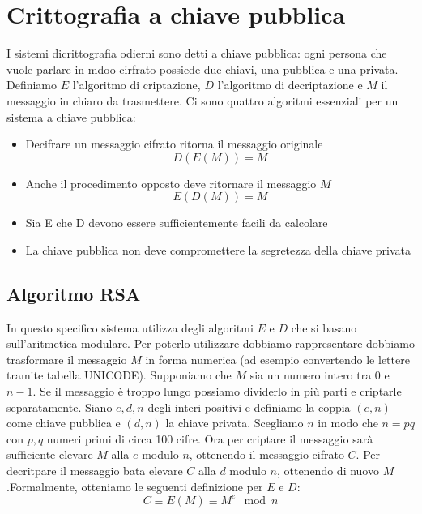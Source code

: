 \documentclass[italian,A4,12pt]{article}
\begin{document}
  \section{Crittografia a chiave pubblica}
    I sistemi dicrittografia odierni sono detti a chiave pubblica: ogni persona che vuole parlare in mdoo cirfrato possiede due chiavi, una pubblica e una privata.\\
    Definiamo $E$ l'algoritmo di criptazione, $D$ l'algoritmo di decriptazione e $M$ il messaggio in chiaro da trasmettere. Ci sono quattro algoritmi essenziali per un sistema a chiave pubblica:
    \begin{itemize}
      \item Decifrare un messaggio cifrato ritorna il messaggio originale $$D(E(M))=M$$
      \item Anche il procedimento opposto deve ritornare il messaggio $M$ $$E(D(M))=M$$
      \item Sia E che D devono essere sufficientemente facili da calcolare
      \item La chiave pubblica non deve compromettere la segretezza della chiave privata
    \end{itemize}
    \subsection{Algoritmo RSA}
      In questo specifico sistema utilizza degli algoritmi $E$ e $D$ che si basano sull'aritmetica modulare. Per poterlo utilizzare dobbiamo rappresentare dobbiamo trasformare il messaggio $M$ in forma numerica (ad esempio convertendo le lettere tramite tabella UNICODE). Supponiamo che $M$ sia un numero intero tra $0$ e $n-1$. Se il messaggio è troppo lungo possiamo dividerlo in più parti e criptarle separatamente. Siano $e,d,n$ degli interi positivi e definiamo la coppia $(e,n)$ come chiave pubblica e $(d,n)$ la chiave privata. Scegliamo $n$ in modo che $n=pq$ con $p,q$ numeri primi di circa 100 cifre.
      Ora per criptare il messaggio sarà sufficiente elevare $M$ alla $e$ modulo $n$, ottenendo il messaggio cifrato $C$. Per decritpare il messaggio bata elevare $C$ alla $d$ modulo $n$, ottenendo di nuovo $M$.Formalmente, otteniamo le seguenti definizione per $E$ e $D$:
      \begin{equation}
      C\equiv E(M) \equiv M^e \mod{n}
    \end{equation}
\end{document}
